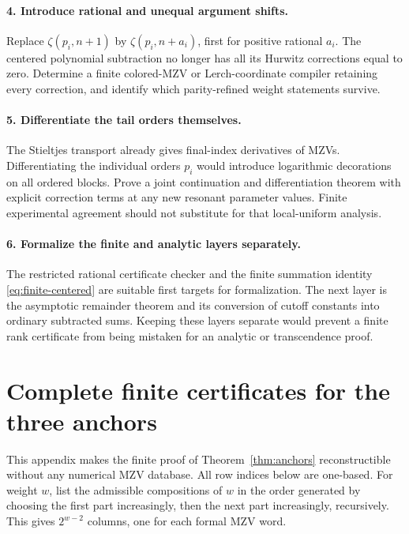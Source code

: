 \documentclass[11pt,letterpaper]{article}
\numberwithin{equation}{section}
\theoremstyle{definition}\newtheorem{definition}[theorem]{Definition}
\theoremstyle{remark}\newtheorem{remark}[theorem]{Remark}
\begin{document}
\paragraph{4. Introduce rational and unequal argument shifts.}
Replace $\zeta(p_i,n+1)$ by $\zeta(p_i,n+a_i)$, first for positive
rational $a_i$. The centered polynomial subtraction no longer has
all its Hurwitz corrections equal to zero. Determine a finite
colored-MZV or Lerch-coordinate compiler retaining every correction,
and identify which parity-refined weight statements survive.

\paragraph{5. Differentiate the tail orders themselves.}
The Stieltjes transport already gives final-index derivatives of
MZVs. Differentiating the individual orders $p_i$ would introduce
logarithmic decorations on all ordered blocks. Prove a joint
continuation and differentiation theorem with explicit correction
terms at any new resonant parameter values. Finite experimental
agreement should not substitute for that local-uniform analysis.

\paragraph{6. Formalize the finite and analytic layers separately.}
The restricted rational certificate checker and the finite summation
identity \eqref{eq:finite-centered} are suitable first targets for
formalization. The next layer is the asymptotic remainder theorem
and its conversion of cutoff constants into ordinary subtracted
sums. Keeping these layers separate would prevent a finite rank
certificate from being mistaken for an analytic or transcendence proof.

\appendix
\section{Complete finite certificates for the three anchors}
\label{app:certificates}

This appendix makes the finite proof of Theorem~\ref{thm:anchors}
reconstructible without any numerical MZV database. All row indices
below are one-based. For weight $w$, list the admissible compositions
of $w$ in the order generated by choosing the first part increasingly,
then the next part increasingly, recursively. This gives $2^{w-2}$
columns, one for each formal MZV word.
\end{document}
